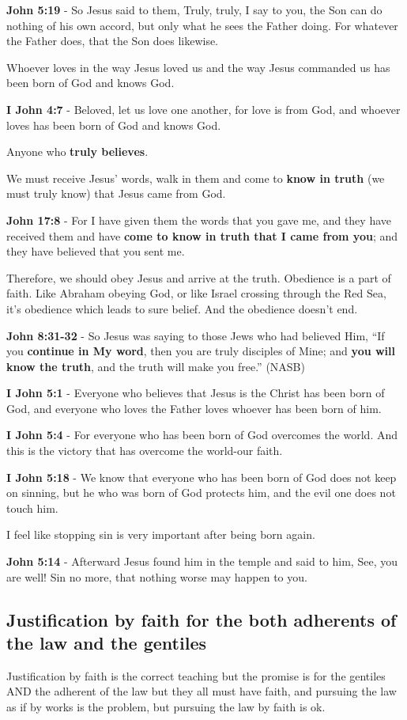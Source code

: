 \documentclass[11pt]{article}
\begin{document}
\textbf{John 5:19} - So Jesus said to them, Truly, truly, I say to you, the Son can do nothing of his own accord, but only what he sees the Father doing. For whatever the Father does, that the Son does likewise.

Whoever loves in the way Jesus loved us and the way Jesus commanded us has been born of God and knows God.

\textbf{I John 4:7} - Beloved, let us love one another, for love is from God, and whoever loves has been born of God and knows God.

Anyone who \textbf{truly believes}.

We must receive Jesus' words, walk in them and come to \textbf{know in truth} (we must truly know) that Jesus came from God.

\textbf{John 17:8} - For I have given them the words that you gave me, and they have received them and have \textbf{come to know in truth that I came from you}; and they have believed that you sent me.

Therefore, we should obey Jesus and arrive at the truth. Obedience is a part of faith. Like Abraham obeying God, or like Israel crossing through the Red Sea, it's obedience which leads to sure belief.
And the obedience doesn't end.

\textbf{John 8:31-32} - So Jesus was saying to those Jews who had believed Him, “If you \textbf{continue in My word}, then you are truly disciples of Mine; and \textbf{you will know the truth}, and the truth will make you free.” (NASB)

\textbf{I John 5:1} - Everyone who believes that Jesus is the Christ has been born of God, and everyone who loves the Father loves whoever has been born of him.

\textbf{I John 5:4} - For everyone who has been born of God overcomes the world. And this is the victory that has overcome the world-our faith.

\textbf{I John 5:18} - We know that everyone who has been born of God does not keep on sinning, but he who was born of God protects him, and the evil one does not touch him.

I feel like stopping sin is very important after being born again.

\textbf{John 5:14} - Afterward Jesus found him in the temple and said to him, See, you are well! Sin no more, that nothing worse may happen to you.

\subsection{Justification by faith for the both adherents of the law and the gentiles}
\label{sec:org434b477}
Justification by faith is the correct teaching but the promise is for the gentiles AND the adherent of the law but they all must have faith, and pursuing the law as if by works is the problem, but pursuing the law by faith is ok.
\end{document}
